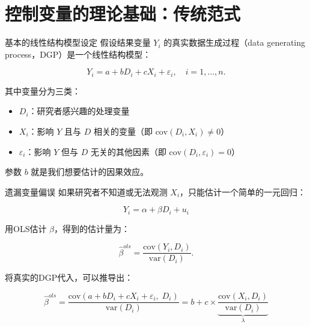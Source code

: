 \section{控制变量的理论基础：传统范式}

\begin{frame}{基本的线性结构模型设定}
假设结果变量 $Y_i$ 的真实数据生成过程（data generating process，DGP）是一个线性结构模型：

\begin{equation}
 Y_i = a + bD_i + cX_i + \varepsilon_i, \quad i = 1, \ldots, n.   
 \label{eq:lin_model}
\end{equation}

其中变量分为三类：
\begin{itemize}
  \item $D_i$：研究者感兴趣的处理变量
  \item $X_i$：影响 $Y$ 且与 $D$ 相关的变量（即 $\text{cov}(D_i, X_i) \neq 0$）
  \item $\varepsilon_i$：影响 $Y$ 但与 $D$ 无关的其他因素（即 $\text{cov}(D_i, \varepsilon_i) = 0$）
\end{itemize}
参数 $b$ 就是我们想要估计的因果效应。
\end{frame}

\begin{frame}{ 遗漏变量偏误}
如果研究者不知道或无法观测 $X_i$，只能估计一个简单的一元回归：


\begin{equation}
Y_i = \alpha + \beta D_i + u_i
\end{equation}


用OLS估计 $\beta$，得到的估计量为：

$$
\hat{\beta}^{ols} = \frac{\text{cov}(Y_i, D_i)}{\text{var}(D_i)}.
$$

将真实的DGP代入，可以推导出：

\begin{equation}
\hat{\beta}^{ols} = \frac{\text{cov}(a + bD_i + cX_i + \varepsilon_i,\; D_i)}{\text{var}(D_i)} = b + c \times \underbrace{\frac{\text{cov}(X_i, D_i)}{\text{var}(D_i)}}_{\lambda}
\end{equation}

\end{frame}

